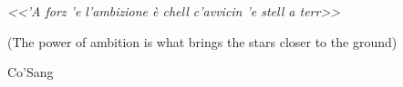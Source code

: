 \cleardoublepage
\thispagestyle{empty}
\begin{flushright}
\itshape <<'A forz 'e l'ambizione è chell c'avvicin 'e stell a terr>> 

        (The power of ambition is what brings the stars closer to the ground)

         Co'Sang

\end{flushright}
\cleardoublepage